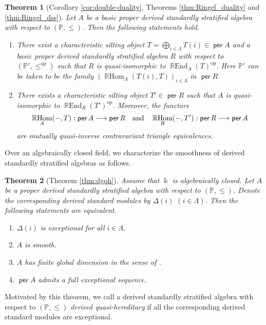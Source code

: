 \documentclass[a4paper,reqno,11pt]{amsart}
\numberwithin{equation}{section}
\newtheorem{theorem}{Theorem}[section]
\theoremstyle{definition}
\newcommand{\PP}{\mathbb{P}}
\newcommand{\bde}{\Delta}
\newcommand{\kk}{\Bbbk}
\newcommand{\op}{\mathrm{op}}
\DeclareMathOperator{\per}{\mathsf{per}}
\DeclareMathOperator{\REnd}{\mathbb{R}End}
\DeclareMathOperator{\RHom}{\mathbb{R}Hom}
\begin{document}
\begin{theorem}[Corollary \ref{cor:double-duality}, Theorems \ref{thm:Ringel_duality} and \ref{thm:Ringel_dss}]
Let $A$ be a basic proper derived standardly stratified algebra with respect to $(\PP,\leq)$.
Then the following statements hold.
\begin{enumerate}
\item There exist a characteristic silting object $T=\bigoplus_{i\in\Lambda}T(i)\in\per A$ and a basic proper derived standardly stratified algebra $R$ with respect to $(\PP',\leq^{\op})$ such that $R$ is quasi-isomorphic to $\REnd_{A}(T)^{\op}$.
Here $\PP'$ can be taken to be the family $(\RHom_{A}(T(i),T))_{i\in\Lambda}$ in $\per R$.
\item There exists a characteristic silting object $T'\in\per R$ such that $A$ is quasi-isomorphic to $\REnd_{R}(T')^{\op}$. Moreover, the functors
\begin{align}
\RHom_{A}(-,T):\per A\longrightarrow\per R \quad\text{and}\quad \RHom_{R}(-,T'):\per R\longrightarrow\per A \notag
\end{align}
are mutually quasi-inverse contravariant triangle equivalences.
\end{enumerate}
\end{theorem}

Over an algebraically closed field, we characterize the smoothness of derived standardly stratified algebras as follows.

\begin{theorem}[Theorem \ref{thm:dgqh}]
Assume that $\kk$ is algebraically closed.
Let $A$ be a proper derived standardly stratified algebra with respect to $(\PP,\leq)$. Denote the corresponding derived standard modules by $\bde(i)$ $(i\in\Lambda)$.
Then the following statements are equivalent.
\begin{enumerate}
\item $\bde(i)$ is exceptional for all $i\in\Lambda$.
\item $A$ is smooth.
\item $A$ has finite global dimension in the sense of \cite{H26}.
\item $\per A$ admits a full exceptional sequence.
\end{enumerate}
\end{theorem}

Motivated by this theorem, we call a derived standardly stratified algebra with respect to $(\PP,\leq)$ \emph{derived quasi-hereditary} if all the corresponding derived standard modules are exceptional.
\end{document}
